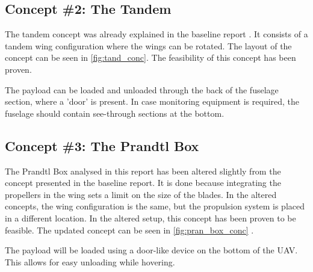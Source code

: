 \subsection{Concept \#2: The Tandem}
The tandem concept was already explained in the baseline report \cite{baseline}. It consists of a tandem wing configuration where the wings can be rotated. The layout of the concept can be seen in \autoref{fig:tand_conc}. The feasibility of this concept has been proven\footnotemark.

The payload can be loaded and unloaded through the back of the fuselage section, where a 'door' is present. In case monitoring equipment is required, the fuselage should contain see-through sections at the bottom. 


\subsection{Concept \#3: The Prandtl Box}
The Prandtl Box analysed in this report has been altered slightly from the concept presented in the baseline report\cite{baseline}. It is done because integrating the propellers in the wing sets a limit on the size of the blades. In the altered concepts, the wing configuration is the same, but the propulsion system is placed in a different location. In the altered setup, this concept has been proven to be feasible\footnotemark. The updated concept can be seen in \autoref{fig:pran_box_conc}
.

The payload will be loaded using a door-like device on the bottom of the UAV. This allows for easy unloading while hovering.

